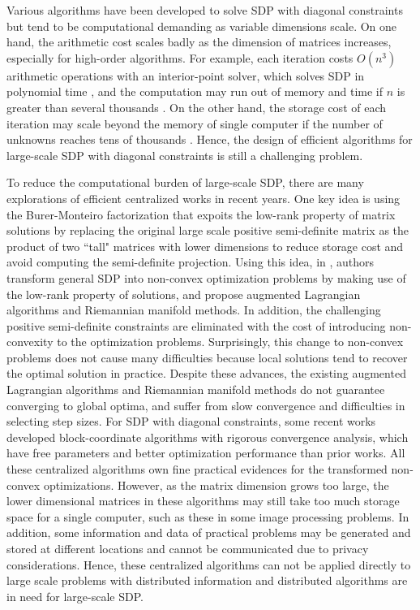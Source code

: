 \documentclass[journal]{IEEEtran}
\newcommand{\upcite}[1]{\textsuperscript{\textsuperscript{\cite{#1}}}}
\begin{document}
Various algorithms have been developed to solve SDP with diagonal constraints but tend to be computational demanding as variable dimensions scale.
On one hand, the arithmetic cost scales badly as the dimension of matrices increases, especially for high-order algorithms. For example, each iteration  costs $O(n^3)$ arithmetic operations with an interior-point solver, which solves SDP in polynomial time \cite{2007Implementation}, and  the computation may run out of memory and time if $n$ is greater than several thousands \cite{BM_smooth}. On the other hand, the storage cost of each iteration may scale beyond the   memory of single computer if the number of unknowns reaches tens of thousands \cite{2015Phase}. Hence, the design of efficient algorithms for large-scale SDP with diagonal constraints is still a challenging problem.

\par  
To reduce the computational burden of large-scale SDP, there are many explorations of efficient centralized works in recent years\upcite{BM_smooth,2017Solving,wang2017mixing,Zhang2012}. 
One key idea is using the Burer-Monteiro factorization that expoits the low-rank property of matrix solutions by replacing the original large scale positive semi-definite matrix  as the product of two ``tall" matrices with lower dimensions to reduce storage cost and avoid computing the semi-definite projection. 
Using this idea, in \cite{BM_SPLR,BM_smooth,lowrank_sdp,2017Solving}, authors transform general SDP into non-convex optimization problems by making use of the low-rank property of solutions, and propose augmented Lagrangian algorithms and Riemannian manifold methods. In addition, the challenging positive semi-definite constraints are eliminated with the cost of introducing non-convexity to the optimization problems. Surprisingly, this change to  non-convex problems does not cause many difficulties because local solutions tend to recover the optimal solution in practice. Despite these advances, the existing augmented Lagrangian algorithms and Riemannian manifold methods do not guarantee converging to global optima, and suffer from slow convergence and difficulties in selecting step sizes. For SDP with diagonal constraints, some recent works\cite{wang2017mixing,erdogdu2018convergence} developed block-coordinate algorithms with rigorous convergence analysis, which have free parameters and better optimization performance than prior works\upcite{BM_SPLR,BM_smooth,lowrank_sdp,2017Solving}. All these centralized algorithms own fine practical evidences for the transformed non-convex optimizations. However, as the matrix dimension grows too large, the lower dimensional matrices in these algorithms may still take too much storage space for a single computer, such as these in some image processing problems. In addition, some information and data of practical problems may be generated and stored at different  locations and cannot be communicated  due to privacy considerations. Hence,  these centralized algorithms can not be applied directly to large scale problems with distributed information and distributed algorithms are in need for large-scale SDP.
\end{document}
